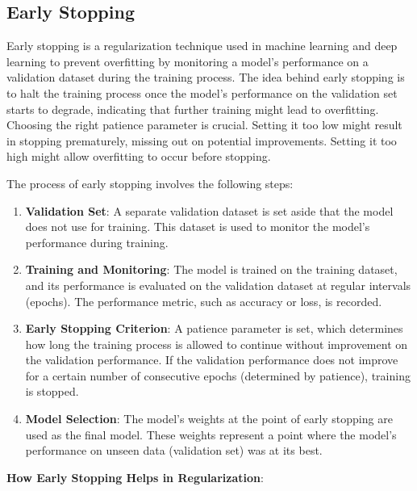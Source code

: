 \documentclass{report}
\begin{document}
\clearpage
\subsection{Early Stopping}

Early stopping is a regularization technique used in machine learning and deep learning to prevent overfitting by monitoring a model's performance on a validation dataset during the training process. The idea behind early stopping is to halt the training process once the model's performance on the validation set starts to degrade, indicating that further training might lead to overfitting. Choosing the right patience parameter is crucial. Setting it too low might result in stopping prematurely, missing out on potential improvements. Setting it too high might allow overfitting to occur before stopping.

The process of early stopping involves the following steps:
\begin{enumerate}
	\item \textbf{Validation Set}: A separate validation dataset is set aside that the model does not use for training. This dataset is used to monitor the model's performance during training.

	\item  \textbf{Training and Monitoring}: The model is trained on the training dataset, and its performance is evaluated on the validation dataset at regular intervals (epochs). The performance metric, such as accuracy or loss, is recorded.

	\item  \textbf{Early Stopping Criterion}: A patience parameter is set, which determines how long the training process is allowed to continue without improvement on the validation performance. If the validation performance does not improve for a certain number of consecutive epochs (determined by patience), training is stopped.

	\item  \textbf{Model Selection}: The model's weights at the point of early stopping are used as the final model. These weights represent a point where the model's performance on unseen data (validation set) was at its best.
\end{enumerate}
\textbf{How Early Stopping Helps in Regularization}:
\end{document}
